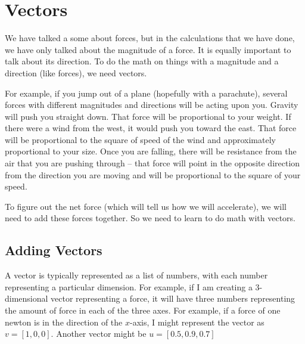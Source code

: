 \chapter{Vectors}

We have talked a some about forces, but in the calculations that we
have done, we have only talked about the magnitude of a force. It is
equally important to talk about its direction. To do the math on
things with a magnitude and a direction (like forces), we need vectors.

For example, if you jump out of a plane (hopefully with a parachute), 
several forces with different magnitudes and directions will be acting upon 
you. Gravity will push you straight down. That force will be proportional to your weight.
If there were a wind from the west, it would push you toward the east. That force
will be proportional to the square of speed of the wind and approximately proportional to 
your size. Once you are falling, there will be resistance from the air 
that you are pushing through -- that force will point in the opposite direction
from the direction you are moving and will be proportional to the square of your
speed.

To figure out the net force (which will tell us how we will accelerate), we will 
need to add these forces together. So we need to learn to do math with vectors.

\section{Adding Vectors}

A vector is typically represented as a list of numbers, with each
number representing a particular dimension. For example, if I am
creating a 3-dimensional vector representing a force, it will have
three numbers representing the amount of force in each of the three
axes. For example, if a force of one newton is in the direction of the
$x$-axis, I might represent the vector as $v = [1, 0, 0]$. 
Another vector might be $u = [0.5, 0.9, 0.7]$


